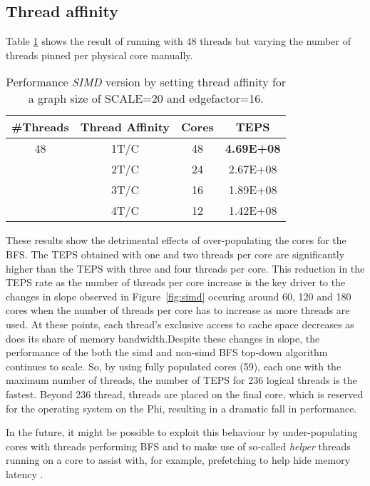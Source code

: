 \documentclass{sig-alternate-05-2015}
\begin{document}
\subsection{Thread affinity}
\label{sub:affinity}
Table \ref{tab:affinity} shows the result of running with 48 threads but varying the number of threads pinned per physical core manually.  
\begin{table}
\begin{center}
\caption{Performance \textit{SIMD} version by setting thread affinity for a graph size of SCALE=20 and edgefactor=16.}
\label{tab:affinity}
 \begin{tabular}{||c c c c||} 
 \hline
 \textbf{\#Threads} & \textbf{Thread Affinity} & \textbf{Cores} & \textbf{TEPS} \\ [0.5ex] 
 \hline
48&	1T/C & 48	& \textbf{4.69E+08} \\
 \hline
&2T/C& 24 & 2.67E+08 \\
\hline
 &3T/C&16&	1.89E+08 \\
 \hline
 &4T/C&12&	1.42E+08 \\
 \hline
 \hline
\end{tabular}
\end{center}
\vspace{-8mm}
\end{table}
These results show the detrimental effects of over-populating the
cores for the BFS. The TEPS obtained with one and two threads per core
are significantly higher than the TEPS with three and four threads per
core. This reduction in the TEPS rate as the number of threads per
core increase is the key driver to the changes in slope observed in
Figure~\ref{fig:simd} occuring around 60, 120 and 180 cores when the
number of threads per core has to increase as more threads are
used. At these points, each thread's exclusive access to cache space
decreases as does its share of memory bandwidth.Despite these changes in slope, the performance of the both the simd
and non-simd BFS top-down algorithm continues to scale. So, by using
fully populated cores (59), each one with the maximum number of
threads, the number of TEPS for 236 logical threads is the
fastest. Beyond 236 thread, threads are placed on the final core,
which is reserved for the operating system on the Phi, resulting in a
dramatic fall in performance.

In the future, it might be possible to exploit this behaviour by
under-populating cores with threads performing BFS and to make use of
so-called {\em helper} threads running on a core to assist with, for
example, prefetching to help hide memory latency
\cite{Kamruzzaman:2011}.
\end{document}
